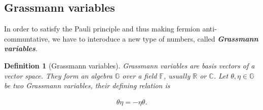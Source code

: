 \documentclass{article}
\theoremstyle{plain} %
\newtheorem{definition}{Definition}[section]
\theoremstyle{convention} %
\theoremstyle{remark} %
\def\df#1{\textbf{\textit{#1}}}
\numberwithin{equation}{section}
\begin{document}
\begin{appendix}

\subsection{Grassmann variables}

\label{sec:grassmann}

In order to satisfy the Pauli principle and thus making fermion anti-communtative, we have to interoduce a new type of numbers, called \df{Grassmann variables}.

\begin{definition}[Grassmann variables]

Grassmann variables are basis vectors of a vector space. They form an algebra $\mathbb{G}$ over a field $\mathbb{F}$, usually $\mathbb{R}$ or $\mathbb{C}$. Let $\theta, \eta \in \mathbb{G}$ be two Grassmann variables, their defining relation is

\begin{align*}
    \theta \eta = - \eta \theta.
\end{align*}


\end{definition}
\end{appendix}
\end{document}
